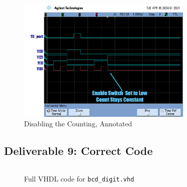 \documentclass[10pt]{article}
\begin{document}
\begin{figure} [H]
  \center
  \includegraphics[width=0.75\textwidth]{figures/enable_off_annotated.png}
  \caption{Disabling the Counting, Annotated}
\end{figure}

\subsection*{Deliverable 9: Correct Code}

\begin{figure}[H]
  \inputminted{vhdl}{./vhdl/bcd_digit.vhd}
  \caption{Full VHDL code for \texttt{bcd\_digit.vhd}}
\end{figure}
\end{document}
